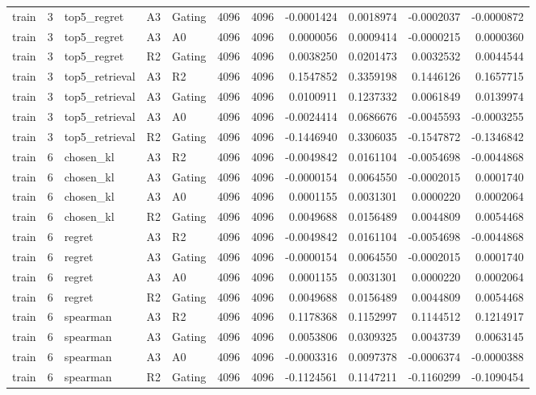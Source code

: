 \begin{tabular}{lrlllrrrrrr}
train & 3 & top5_regret & A3 & Gating & 4096 & 4096 & -0.0001424 & 0.0018974 & -0.0002037 & -0.0000872 \\
train & 3 & top5_regret & A3 & A0 & 4096 & 4096 & 0.0000056 & 0.0009414 & -0.0000215 & 0.0000360 \\
train & 3 & top5_regret & R2 & Gating & 4096 & 4096 & 0.0038250 & 0.0201473 & 0.0032532 & 0.0044544 \\
train & 3 & top5_retrieval & A3 & R2 & 4096 & 4096 & 0.1547852 & 0.3359198 & 0.1446126 & 0.1657715 \\
train & 3 & top5_retrieval & A3 & Gating & 4096 & 4096 & 0.0100911 & 0.1237332 & 0.0061849 & 0.0139974 \\
train & 3 & top5_retrieval & A3 & A0 & 4096 & 4096 & -0.0024414 & 0.0686676 & -0.0045593 & -0.0003255 \\
train & 3 & top5_retrieval & R2 & Gating & 4096 & 4096 & -0.1446940 & 0.3306035 & -0.1547872 & -0.1346842 \\
train & 6 & chosen_kl & A3 & R2 & 4096 & 4096 & -0.0049842 & 0.0161104 & -0.0054698 & -0.0044868 \\
train & 6 & chosen_kl & A3 & Gating & 4096 & 4096 & -0.0000154 & 0.0064550 & -0.0002015 & 0.0001740 \\
train & 6 & chosen_kl & A3 & A0 & 4096 & 4096 & 0.0001155 & 0.0031301 & 0.0000220 & 0.0002064 \\
train & 6 & chosen_kl & R2 & Gating & 4096 & 4096 & 0.0049688 & 0.0156489 & 0.0044809 & 0.0054468 \\
train & 6 & regret & A3 & R2 & 4096 & 4096 & -0.0049842 & 0.0161104 & -0.0054698 & -0.0044868 \\
train & 6 & regret & A3 & Gating & 4096 & 4096 & -0.0000154 & 0.0064550 & -0.0002015 & 0.0001740 \\
train & 6 & regret & A3 & A0 & 4096 & 4096 & 0.0001155 & 0.0031301 & 0.0000220 & 0.0002064 \\
train & 6 & regret & R2 & Gating & 4096 & 4096 & 0.0049688 & 0.0156489 & 0.0044809 & 0.0054468 \\
train & 6 & spearman & A3 & R2 & 4096 & 4096 & 0.1178368 & 0.1152997 & 0.1144512 & 0.1214917 \\
train & 6 & spearman & A3 & Gating & 4096 & 4096 & 0.0053806 & 0.0309325 & 0.0043739 & 0.0063145 \\
train & 6 & spearman & A3 & A0 & 4096 & 4096 & -0.0003316 & 0.0097378 & -0.0006374 & -0.0000388 \\
train & 6 & spearman & R2 & Gating & 4096 & 4096 & -0.1124561 & 0.1147211 & -0.1160299 & -0.1090454 \\

\end{tabular}

